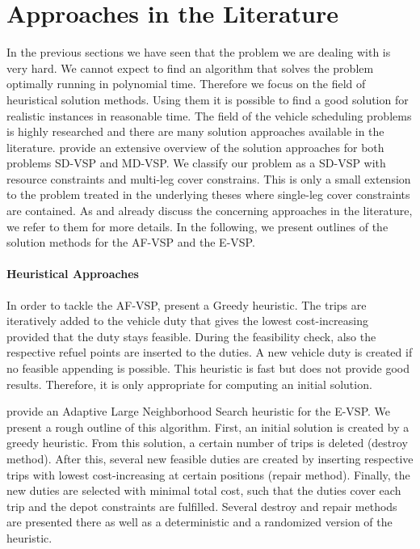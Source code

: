 
\section{Approaches in the Literature}

In the previous sections we have seen that the problem we are dealing with is very hard. We cannot expect to find an algorithm that solves the problem optimally running in polynomial time. Therefore we focus on the field of heuristical solution methods. Using them it is possible to find a good solution for realistic instances in reasonable time. The field of the vehicle scheduling problems is highly researched and there are many solution approaches available in the literature. \cite{Bunte_Kliewer} provide an extensive overview of the solution approaches for both problems SD-VSP and MD-VSP. We classify our problem as a SD-VSP with resource constraints and multi-leg cover constrains. This is only a small extension to the problem treated in the underlying theses where single-leg cover constraints are contained. As \cite{Kaiser} and \cite{Knoll} already discuss the concerning approaches in the literature, we refer to them for more details. In the following, we present outlines of the solution methods for the AF-VSP and the E-VSP.

\paragraph{Heuristical Approaches} \parfill

In order to tackle the AF-VSP, \cite{Adler} present a Greedy heuristic. The trips are iteratively added to the vehicle duty that gives the lowest cost-increasing provided that the duty stays feasible. During the feasibility check, also the respective refuel points are inserted to the duties. A new vehicle duty is created if no feasible appending is possible. This heuristic is fast but does not provide good results. Therefore, it is only appropriate for computing an initial solution.

\cite{Wen} provide an Adaptive Large Neighborhood Search heuristic for the E-VSP. We present a rough outline of this algorithm. First, an initial solution is created by a greedy heuristic. From this solution, a certain number of trips is deleted (destroy method). After this, several new feasible duties are created by inserting respective trips with lowest cost-increasing at certain positions (repair method). Finally, the new duties are selected with minimal total cost, such that the duties cover each trip and the depot constraints are fulfilled. Several destroy and repair methods are presented there as well as a deterministic and a randomized version of the heuristic.

